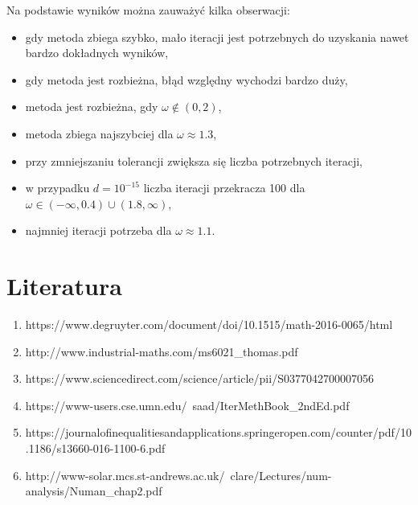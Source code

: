 \documentclass[12pt]{article}
\begin{document}
Na podstawie wyników można zauważyć kilka obserwacji:
\begin{itemize}
    \item gdy metoda zbiega szybko, mało iteracji jest potrzebnych do uzyskania nawet bardzo dokładnych wyników,
    \item gdy metoda jest rozbieżna, błąd względny wychodzi bardzo duży,
    \item metoda jest rozbieżna, gdy $\omega \notin (0,2)$,
    \item metoda zbiega najszybciej dla $\omega \approx 1.3$,
    \item przy zmniejszaniu tolerancji zwiększa się liczba potrzebnych iteracji,
    \item w przypadku $d = 10^{-15}$ liczba iteracji przekracza 100 dla $\omega \in (-\infty,0.4)\cup(1.8,\infty)$,
    \item najmniej iteracji potrzeba dla $\omega \approx 1.1$.
\end{itemize}

\section{Literatura}
\begin{enumerate}
\item https://www.degruyter.com/document/doi/10.1515/math-2016-0065/html
\item http://www.industrial-maths.com/ms6021\_thomas.pdf
\item https://www.sciencedirect.com/science/article/pii/S0377042700007056
\item https://www-users.cse.umn.edu/~saad/IterMethBook\_2ndEd.pdf
\item https://journalofinequalitiesandapplications.springeropen.com/counter/pdf/10.1186/s13660-016-1100-6.pdf
\item http://www-solar.mcs.st-andrews.ac.uk/~clare/Lectures/num-analysis/Numan\_chap2.pdf
\end{enumerate}
\end{document}
